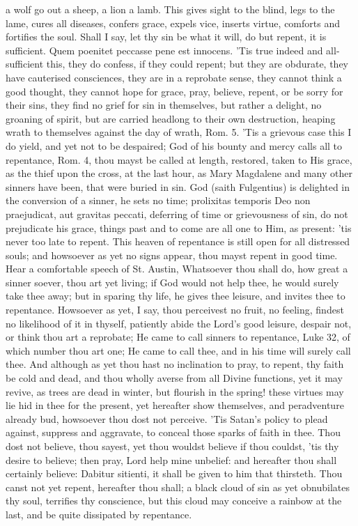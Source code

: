 {a wolf go out a sheep, a lion a lamb. This gives sight to the
blind, legs to the lame, cures all diseases, confers grace, expels
vice, inserts virtue, comforts and fortifies the soul. Shall I say, let
thy sin be what it will, do but repent, it is sufficient. Quem
poenitet peccasse pene est innocens. 'Tis true indeed and
all-sufficient this, they do confess, if they could repent; but they
are obdurate, they have cauterised consciences, they are in a reprobate
sense, they cannot think a good thought, they cannot hope for grace,
pray, believe, repent, or be sorry for their sins, they find no grief
for sin in themselves, but rather a delight, no groaning of spirit, but
are carried headlong to their own destruction, heaping wrath to
themselves against the day of wrath, Rom.  5. 'Tis a grievous case
this I do yield, and yet not to be despaired; God of his bounty and
mercy calls all to repentance, Rom.  4, thou mayst be called at
length, restored, taken to His grace, as the thief upon the cross, at
the last hour, as Mary Magdalene and many other sinners have been, that
were buried in sin. God (saith Fulgentius) is delighted in the
conversion of a sinner, he sets no time; prolixitas temporis Deo non
praejudicat, aut gravitas peccati, deferring of time or grievousness of
sin, do not prejudicate his grace, things past and to come are all one
to Him, as present: 'tis never too late to repent. This heaven of
repentance is still open for all distressed souls; and howsoever as yet
no signs appear, thou mayst repent in good time. Hear a comfortable
speech of St. Austin, Whatsoever thou shall do, how great a
sinner soever, thou art yet living; if God would not help thee, he
would surely take thee away; but in sparing thy life, he gives thee
leisure, and invites thee to repentance. Howsoever as yet, I say, thou
perceivest no fruit, no feeling, findest no likelihood of it in
thyself, patiently abide the Lord's good leisure, despair not, or think
thou art a reprobate; He came to call sinners to repentance, Luke 
32, of which number thou art one; He came to call thee, and in his time
will surely call thee. And although as yet thou hast no inclination to
pray, to repent, thy faith be cold and dead, and thou wholly averse
from all Divine functions, yet it may revive, as trees are dead in
winter, but flourish in the spring! these virtues may lie hid in thee
for the present, yet hereafter show themselves, and peradventure
already bud, howsoever thou dost not perceive. 'Tis Satan's policy to
plead against, suppress and aggravate, to conceal those sparks of faith
in thee. Thou dost not believe, thou sayest, yet thou wouldst believe
if thou couldst, 'tis thy desire to believe; then pray, Lord help
mine unbelief: and hereafter thou shall certainly believe:
Dabitur sitienti, it shall be given to him that thirsteth. Thou
canst not yet repent, hereafter thou shall; a black cloud of sin as yet
obnubilates thy soul, terrifies thy conscience, but this cloud may
conceive a rainbow at the last, and be quite dissipated by repentance.

}
